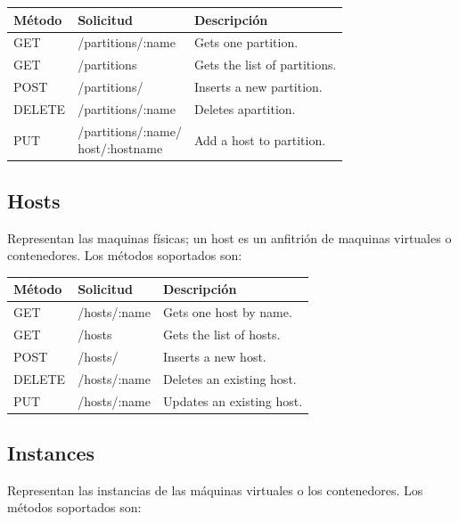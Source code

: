 \documentclass[conference, spanish]{IEEEtran}
\begin{document}
\begin{center}
 \small
 \begin{tabular}{| l | l | l |}
 \hline
  \textbf{Método} & \textbf{Solicitud} & \textbf{Descripción} \\ [0.5ex] 
  \hline\hline
  GET & /partitions/:name & Gets one partition. \\
  \hline
  GET & /partitions & Gets the list of partitions. \\
  \hline  
  POST & /partitions/ & Inserts a new partition. \\
  \hline
  DELETE & /partitions/:name & Deletes apartition. \\
  \hline  
  PUT & \pbox{5cm}{/partitions/:name/ \\host/:hostname} & Add a host to partition. \\ [1ex] 
  \hline
\end{tabular}
\end{center}

\subsection{Hosts}
Representan las maquinas físicas; un host es un anfitrión de maquinas virtuales o contenedores. Los métodos soportados son:

\begin{center}
 \small
 \begin{tabular}{| l | l | l |}
 \hline
 \textbf{Método} & \textbf{Solicitud} & \textbf{Descripción} \\ [0.5ex] 
  \hline\hline
  GET & /hosts/:name & Gets one host by name. \\
  \hline
  GET & /hosts & Gets the list of hosts. \\
  \hline  
  POST & /hosts/ & Inserts a new host. \\
  \hline
  DELETE & /hosts/:name & Deletes an existing host. \\
  \hline  
  PUT & /hosts/:name & Updates an existing host. \\ [1ex] 
  \hline
\end{tabular}
\end{center}

\subsection{Instances}
Representan las instancias de las máquinas virtuales o los contenedores. Los métodos soportados son:
\end{document}
